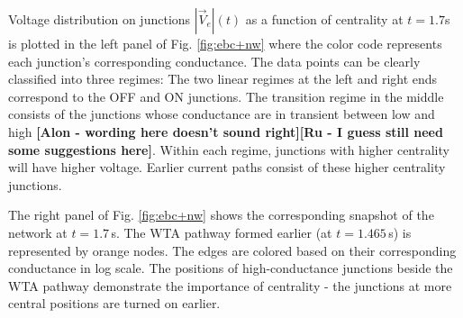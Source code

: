 \documentclass[fleqn,10pt,  reprint, amsmath,amssymb,aps, floatfix]{wlscirep}
\begin{document}



Voltage distribution on junctions $|\vec{V}_e|(t)$ as a function of centrality at $t = 1.7$s is plotted in the left panel of Fig. \ref{fig:ebc+nw} where the color code represents each junction's corresponding conductance. The data points can be clearly classified into three regimes: The two linear regimes at the left and right ends correspond to the OFF and ON junctions. The transition regime in the middle consists of the junctions whose conductance are in transient between low and high \textbf{[Alon -  wording here doesn't sound right][Ru - I guess still need some suggestions here]}. Within each regime, junctions with higher centrality will have higher voltage. Earlier current paths consist of these higher centrality junctions.

The right panel of Fig. \ref{fig:ebc+nw} shows the corresponding snapshot of the network at $t = 1.7\,$s. The WTA pathway formed earlier (at $t = 1.465 \,$s) is represented by orange nodes. The edges are colored based on their corresponding conductance in log scale. The positions of high-conductance junctions beside the WTA pathway demonstrate the importance of centrality - the junctions at more central positions are turned on earlier.
\end{document}

